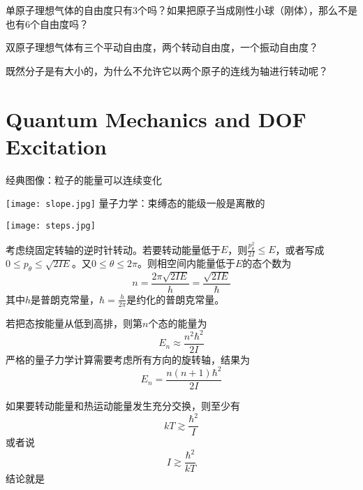 \documentclass[CJK]{beamer}
\begin{document}
\begin{frame}
\bch
单原子理想气体的自由度只有3个吗？如果把原子当成刚性小球（刚体），那么不是也有6个自由度吗？



\ech
\end{frame}


\begin{frame}
\bch
双原子理想气体有三个平动自由度，两个转动自由度，一个振动自由度？

既然分子是有大小的，为什么不允许它以两个原子的连线为轴进行转动呢？



\ech
\end{frame}


\section{Quantum Mechanics and DOF Excitation}


\begin{frame}
\bch
{}
经典图像：粒子的能量可以连续变化 

\texttt{[image: slope.jpg]}
\emini
\hspace{0.2in}
量子力学：束缚态的能级一般是离散的

 \texttt{[image: steps.jpg]}  
\emini
\ech
\end{frame}





\begin{frame}
\bch
{\large
考虑绕固定转轴的逆时针转动。若要转动能量低于$E$，则$\frac{p_\theta^2}{2I} \le E$，或者写成$0\le p_\theta \le \sqrt{2I E}$。又$0\le \theta \le 2\pi$。则相空间内能量低于$E$的态个数为
$$n = \frac{2\pi \sqrt{2IE}}{h} = \frac{\sqrt{2IE}}{\hbar}$$
其中{\blue $h$是普朗克常量，$\hbar = \frac{h}{2\pi}$是约化的普朗克常量}。

若把态按能量从低到高排，则第$n$个态的能量为
$$E_n \approx \frac{n^2\hbar^2}{2I}$$
严格的量子力学计算需要考虑所有方向的旋转轴，结果为
$$E_n = \frac{n(n+1)\hbar^2}{2I}$$}
\ech
\end{frame}


\begin{frame}
\bch
    {\large
      如果要转动能量和热运动能量发生充分交换，则至少有
$$kT \gtrsim \frac{\hbar^2}{I}$$
或者说
$$I \gtrsim \frac{\hbar^2}{kT}$$
结论就是
}
\ech
\end{frame}
\end{document}
